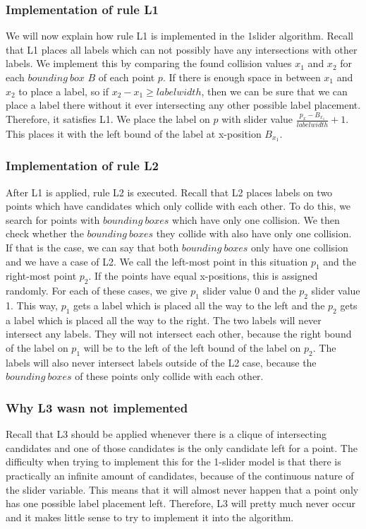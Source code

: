 \documentclass[crop=false,a4paper,oneside,11pt]{article}
\begin{document}
\subsubsection{Implementation of rule L1}
We will now explain how rule L1 is implemented in the 1slider algorithm. Recall that L1 places all labels which can not possibly have any intersections with other labels. We implement this by comparing the found collision values $x_1$ and $x_2$ for each $bounding \ box$ $B$ of each point $p$. If there is enough space in between $x_1$ and $x_2$ to place a label, so if $x_2 - x_1 \geq labelwidth$, then we can be sure that we can place a label there without it ever intersecting any other possible label placement. Therefore, it satisfies L1. We place the label on $p$ with slider value $\frac{p_x - B_{x_1}}{labelwidth} + 1$. This places it with the left bound of the label at x-position $B_{x_1}$.

\subsubsection{Implementation of rule L2}
After L1 is applied, rule L2 is executed. Recall that L2 places labels on two points which have candidates which only collide with each other. To do this, we search for points with $bounding \ boxes$ which have only one collision. We then check whether the $bounding \ boxes$ they collide with also have only one collision. If that is the case, we can say that both $bounding \ boxes$ only have one collision and we have a case of L2. We call the left-most point in this situation $p_1$ and the right-most point $p_2$. If the points have equal x-positions, this is assigned randomly. For each of these cases, we give $p_1$ slider value 0 and the $p_2$ slider value 1. This way, $p_1$ gets a label which is placed all the way to the left and the $p_2$ gets a label which is placed all the way to the right. The two labels will never intersect any labels. They will not intersect each other, because the right bound of the label on $p_1$ will be to the left of the left bound of the label on $p_2$. The labels will also never intersect labels outside of the L2 case, because the $bounding \ boxes$ of these points only collide with each other.

\subsubsection{Why L3 wasn not implemented}
Recall that L3 should be applied whenever there is a clique of intersecting candidates and one of those candidates is the only candidate left for a point. The difficulty when trying to implement this for the 1-slider model is that there is practically an infinite amount of candidates, because of the continuous nature of the slider variable. This means that it will almost never happen that a point only has one possible label placement left. Therefore, L3 will pretty much never occur and it makes little sense to try to implement it into the algorithm.
\end{document}

